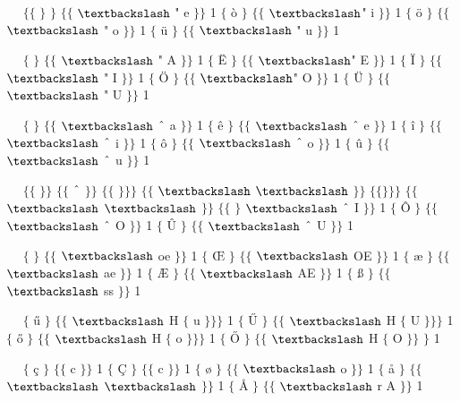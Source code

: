 ~~ $ \{ $$ \{ $ $ \} $ $ \} $ $ \{ $$ \{ $ $\textbackslash$ " e $ \} $$ \} $ 1 $ \{ $ ò $ \} $ $ \{ $$ \{ $ $\textbackslash$" i $ \} $$ \} $ 1 $ \{ $ ö $ \} $ $ \{ $$ \{ $ $\textbackslash$ " o $ \} $$ \} $ 1 $ \{ $ ü $ \} $ $ \{ $$ \{ $ $\textbackslash$ " u $ \} $$ \} $ 1\par

~~ $ \{ $ $ \} $ $ \{ $$ \{ $ $\textbackslash$ " A $ \} $$ \} $ 1 $ \{ $ Ë $ \} $ $ \{ $$ \{ $ $\textbackslash$" E $ \} $$ \} $ 1 $ \{ $ Ï $ \} $ $ \{ $$ \{ $ $\textbackslash$ " I $ \} $$ \} $ 1 $ \{ $ Ö $ \} $ $ \{ $$ \{ $ $\textbackslash$" O $ \} $$ \} $ 1 $ \{ $ Ü $ \} $ $ \{ $$ \{ $ $\textbackslash$ " U $ \} $$ \} $ 1\par

~~ $ \{ $ $ \} $ $ \{ $$ \{ $ $\textbackslash$ $ \string^ $ a $ \} $$ \} $ 1 $ \{ $ ê $ \} $ $ \{ $$ \{ $ $\textbackslash$ $ \string^ $ e $ \} $$ \} $ 1 $ \{ $ î $ \} $ $ \{ $$ \{ $ $\textbackslash$ $ \string^ $ i $ \} $$ \} $ 1 $ \{ $ ô $ \} $ $ \{ $$ \{ $ $\textbackslash$ $ \string^ $ o $ \} $$ \} $ 1 $ \{ $ û $ \} $ $ \{ $$ \{ $ $\textbackslash$ $ \string^ $ u $ \} $$ \} $ 1\par

~~ $ \{ $$ \{ $ $ \} $$ \} $ $ \{ $$ \{ $ $ \string^ $ $ \} $$ \} $ $ \{ $$ \{ $ $ \} $$ \} $$ \} $ $ \{ $$ \{ $ $\textbackslash$ $\textbackslash$ $ \} $$ \} $ $ \{ $$ \{ $$ \} $$ \} $$ \} $ $ \{ $$ \{ $ $\textbackslash$ $\textbackslash$ $ \} $$ \} $ $ \{ $$ \{ $ $ \} $ $\textbackslash$ $ \string^ $ I $ \} $$ \} $ 1 $ \{ $ Ô $ \} $ $ \{ $$ \{ $ $\textbackslash$ $ \string^ $ O $ \} $$ \} $ 1 $ \{ $ Û $ \} $ $ \{ $$ \{ $ $\textbackslash$ $ \string^ $ U $ \} $$ \} $ 1\par

~~ $ \{ $ $ \} $ $ \{ $$ \{ $ $\textbackslash$ oe $ \} $$ \} $ 1 $ \{ $ Œ $ \} $ $ \{ $$ \{ $ $\textbackslash$ OE $ \} $$ \} $ 1 $ \{ $ æ $ \} $ $ \{ $$ \{ $ $\textbackslash$ ae $ \} $$ \} $ 1 $ \{ $ Æ $ \} $ $ \{ $$ \{ $ $\textbackslash$ AE $ \} $$ \} $ 1 $ \{ $ ß $ \} $ $ \{ $$ \{ $ $\textbackslash$ ss $ \} $$ \} $ 1\par

~~ $ \{ $ ű $ \} $ $ \{ $$ \{ $ $\textbackslash$ H $ \{ $ u $ \} $$ \} $$ \} $ 1 $ \{ $ Ű $ \} $ $ \{ $$ \{ $ $\textbackslash$ H $ \{ $ U $ \} $$ \} $$ \} $ 1 $ \{ $ ő $ \} $ $ \{ $$ \{ $ $\textbackslash$ H $ \{ $ o $ \} $$ \} $$ \} $ 1 $ \{ $ Ő $ \} $ $ \{ $$ \{ $ $\textbackslash$ H $ \{ $ O $ \} $$ \} $ $ \} $ 1\par

~~ $ \{ $ ç $ \} $ $ \{ $$ \{ $ c $ \} $$ \} $ 1 $ \{ $ Ç $ \} $ $ \{ $$ \{ $ c $ \} $$ \} $ 1 $ \{ $ ø $ \} $ $ \{ $$ \{ $ $\textbackslash$ o $ \} $$ \} $ 1 $ \{ $ å $ \} $ $ \{ $$ \{ $ $\textbackslash$ $\textbackslash$ $ \} $$ \} $ 1 $ \{ $ Å $ \} $ $ \{ $$ \{ $ $\textbackslash$ r A $ \} $$ \} $ 1\par

